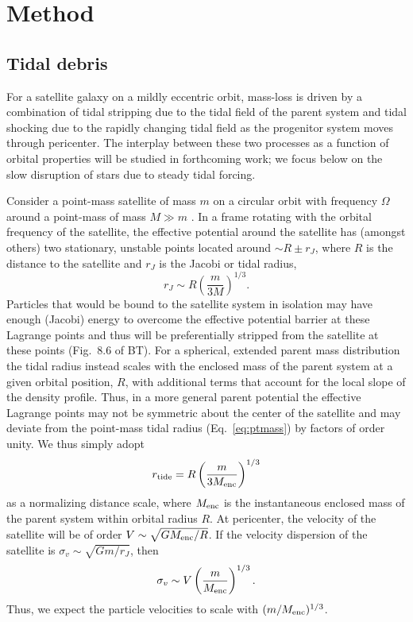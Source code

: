 \documentclass[letterpaper,12pt,preprint]{aastex}
\begin{document}
\section{Method}

\subsection{Tidal debris}\label{sec:debris}

For a satellite galaxy on a mildly eccentric orbit, mass-loss is driven by a combination of tidal stripping due to the tidal field of the parent system and tidal shocking due to the rapidly changing tidal field as the progenitor system moves through pericenter. The interplay between these two processes as a function of orbital properties will be studied in forthcoming work; we focus below on the slow disruption of stars due to steady tidal forcing. 

Consider a point-mass satellite of mass $m$ on a circular orbit with frequency $\Omega$ around a point-mass of mass $M\gg m$ \citep[the restricted three-body problem; e.g., \S 8.3][]{binneytremaine}. In a frame rotating with the orbital frequency of the satellite, the effective potential around the satellite has (amongst others) two stationary, unstable points located around $\sim R \pm r_J$, where $R$ is the distance to the satellite and $r_J$ is the Jacobi or tidal radius,
\begin{equation}
	r_J \sim R\left(\frac{m}{3M}\right)^{1/3}.\label{eq:ptmass}
\end{equation}
Particles that would be bound to the satellite system in isolation may have enough (Jacobi) energy to overcome the effective potential barrier at these Lagrange points and thus will be preferentially stripped from the satellite at these points (Fig.~8.6 of BT). For a spherical, extended parent mass distribution the tidal radius instead scales with the enclosed mass of the parent system at a given orbital position, $R$, with additional terms that account for the local slope of the density profile. Thus, in a more general parent potential the effective Lagrange points may not be symmetric about the center of the satellite and may deviate from the point-mass tidal radius (Eq.~\ref{eq:ptmass}) by factors of order unity. We thus simply adopt 
\begin{equation}
	r_{\rm tide} = R\left(\frac{m}{3M_{\rm enc}}\right)^{1/3}\label{eq:tidalradius}
\end{equation}
as a normalizing distance scale, where $M_{\rm enc}$ is the instantaneous enclosed mass of the parent system within orbital radius $R$. At pericenter, the velocity of the satellite will be of order $V\sim \sqrt{GM_{\rm enc}/R}$. If the velocity dispersion of the satellite is $\sigma_v \sim \sqrt{Gm/r_J}$, then
\begin{equation}
	\sigma_v \sim V\left(\frac{m}{M_{\rm enc}}\right)^{1/3}\label{eq:velscale}.
\end{equation}
Thus, we expect the particle velocities to scale with $(m/M_{\rm enc})^{1/3}$. 
\end{document}
